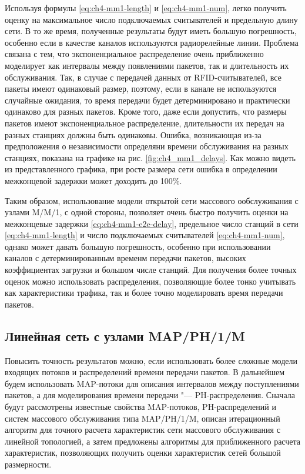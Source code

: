 Используя формулы \eqref{eq:ch4-mm1-length} и \eqref{eq:ch4-mm1-num}, легко получить оценку на максимальное число подключаемых считывателей и предельную длину сети. В то же время, полученные результаты будут иметь большую погрешность, особенно если в качестве каналов используются радиорелейные линии. Проблема связана с тем, что экспоненциальное распределение очень приближенно моделирует как интервалы между появлениями пакетов, так и длительность их обслуживания. Так, в случае с передачей данных от RFID-считывателей, все пакеты имеют одинаковый размер, поэтому, если в канале не используются случайные ожидания, то время передачи будет детерминировано и практически одинаково для разных пакетов. Кроме того, даже если допустить, что размеры пакетов имеют экспоненциальное распределение, длительности их передач на разных станциях должны быть одинаковы. Ошибка, возникающая из-за предположения о независимости определяни времени обслуживания на разных станциях, показана на графике на рис. \ref{fig:ch4_mm1_delays}. Как можно видеть из представленного графика, при росте размера сети ошибка в определении межконцевой задержки может доходить до 100\%.

Таким образом, использование модели открытой сети массового ообслуживания с узлами M/M/1, с одной стороны, позволяет очень быстро получить оценки на межконцевые задержки \eqref{eq:ch4-mm1-e2e-delay}, предельное число станций в сети \eqref{eq:ch4-mm1-length} и число подключаемых считывателей \eqref{eq:ch4-mm1-num}, однако может давать большую погрешность, особенно при использовании каналов с детерминированным временм передачи пакетов, высоких коэффициентах загрузки и большом числе станций. Для получения более точных оценок можно использовать распределения, позволяющие более тонко учитывать как характеристики трафика, так и более точно моделировать время передачи пакетов.







\subsection{Линейная сеть с узлами MAP/PH/1/M}
Повысить точность результатов можно, если использовать более сложные модели входящих потоков и распределений времени передачи пакетов. В дальнейшем будем использовать MAP-потоки для описания интервалов между поступлениями пакетов, а для моделирования времени передачи "--- PH-распределения. Сначала будут рассмотрены известные свойства MAP-потоков, PH-распределений и систем массового обслуживания типа MAP/PH/1/M, описан итерационный алгоритм для точного расчета характеристик сети массового обслуживания с линейной топологией, а затем предложены алгоритмы для приближенного расчета характеристик, позволяющих получить оценки характеристик сетей большой размерности.


